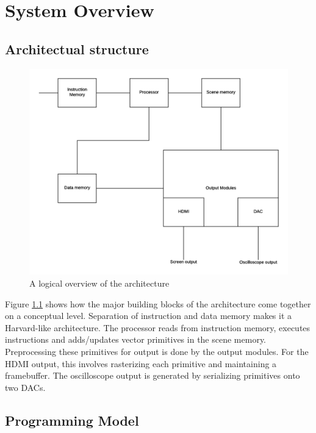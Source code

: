 \chapter{System Overview}

\section{Architectual structure}

\begin{figure}[h!]
    \includegraphics[width=\linewidth]{images/system-overview.png}
    \caption{A logical overview of the \vthreek architecture}
    \label{fig:system-overview}
\end{figure}

Figure \ref{fig:system-overview} shows how the major building blocks of the \vthreek architecture come together on a conceptual level.
Separation of instruction and data memory makes it a Harvard-like architecture.
The processor reads from instruction memory, executes instructions and adds/updates vector primitives in the scene memory.
Preprocessing these primitives for output is done by the output modules.
For the HDMI output, this involves rasterizing each primitive and maintaining a framebuffer.
The oscilloscope output is generated by serializing primitives onto two DACs.

\section{Programming Model}

